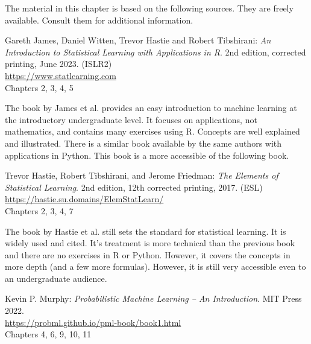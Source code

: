 The material in this chapter is based on the following sources. They are freely available. Consult them for additional information.

\begin{resourcebox}
Gareth James, Daniel Witten, Trevor Hastie and Robert Tibshirani: \emph{An Introduction to Statistical Learning with Applications in R}. 2nd edition, corrected printing, June 2023. (ISLR2) \\
\vspace{1mm}
\url{https://www.statlearning.com} \\
\vspace{1mm}
Chapters 2, 3, 4, 5
\end{resourcebox}

The book by James et al. provides an easy introduction to machine learning at the introductory undergraduate level. It focuses on applications, not mathematics, and contains many exercises using R. Concepts are well explained and illustrated. There is a similar book available by the same authors with applications in Python. This book is a more accessible of the following book.

\begin{resourcebox}
Trevor Hastie, Robert Tibshirani, and Jerome Friedman: \emph{The Elements of Statistical Learning}. 2nd edition, 12th corrected printing, 2017. (ESL) \\
\vspace{1mm}
\url{https://hastie.su.domains/ElemStatLearn/} \\
\vspace{1mm}
Chapters 2, 3, 4, 7
\end{resourcebox}

The book by Hastie et al. still sets the standard for statistical learning. It is widely used and cited. It's treatment is more technical than the previous book and there are no exercises in R or Python. However, it covers the concepts in more depth (and a few more formulas). However, it is still very accessible even to an undergraduate audience.

\begin{resourcebox}
Kevin P. Murphy: \emph{Probabilistic Machine Learning -- An Introduction}. MIT Press 2022. \\
\vspace{1mm}
\url{https://probml.github.io/pml-book/book1.html} \\
\vspace{1mm}
Chapters 4, 6, 9, 10, 11
\end{resourcebox}


